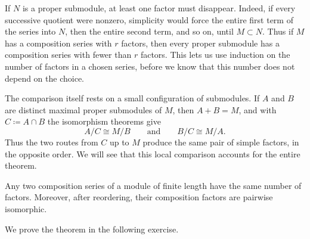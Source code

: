 \documentclass[12pt,reqno]{amsart}
\begin{document}
If $N$ is a proper submodule, at least one factor must disappear. Indeed, if every successive quotient were nonzero, simplicity would force the entire first term of the series into $N$, then the entire second term, and so on, until $M\subset N$. Thus if $M$ has a composition series with $r$ factors, then every proper submodule has a composition series with fewer than $r$ factors. This lets us use induction on the number of factors in a chosen series, before we know that this number does not depend on the choice.

The comparison itself rests on a small configuration of submodules. If $A$ and $B$ are distinct maximal proper submodules of $M$, then $A+B=M$, and with $C\coloneqq A\cap B$ the isomorphism theorems give
\[
A/C\cong M/B\qquad\text{and}\qquad B/C\cong M/A.
\]
Thus the two routes from $C$ up to $M$ produce the same pair of simple factors, in the opposite order. We will see that this local comparison accounts for the entire theorem.

\begin{theorem}
Any two composition series of a module of finite length have the same number of factors. Moreover, after reordering, their composition factors are pairwise isomorphic.
\end{theorem}

We prove the theorem in the following exercise.

\hrulefill
\end{document}
